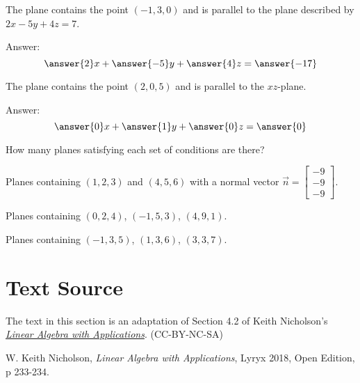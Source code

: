 \documentclass{ximera}
\begin{document}
  \begin{problem}\label{prob:eqplane2}
  The plane contains the point $(-1, 3, 0)$ and is parallel to the plane described by $2x-5y+4z=7$.
   
  Answer:
  $$\answer{2}x+\answer{-5}y+\answer{4}z=\answer{-17}$$
  \end{problem}
   
  \begin{problem}\label{prob:eqplane3}
  The plane contains the point $(2, 0, 5)$ and is parallel to the $xz$-plane.
   
  Answer:
  $$\answer{0}x+\answer{1}y+\answer{0}z=\answer{0}$$
  \end{problem}
 
 
 
 
How many planes satisfying each set of conditions are there?
 
\begin{problem}\label{prob:eqplane4}
Planes containing $(1, 2, 3)$ and $(4, 5, 6)$ with a normal vector $\vec{n}=\begin{bmatrix}-9\\-9\\-9\end{bmatrix}$.
\begin{multipleChoice}
 \end{multipleChoice}
\end{problem}
 
\begin{problem}\label{prob:eqplane5}
Planes containing $(0,2, 4)$, $(-1, 5, 3)$, $(4, 9, 1)$.
\begin{multipleChoice}
 \end{multipleChoice}
\end{problem}
 
\begin{problem}\label{prob:eqplane6}
Planes containing $(-1, 3, 5)$, $(1, 3, 6)$, $(3, 3, 7)$.
\begin{multipleChoice}
 \end{multipleChoice}
\end{problem}
 
 
 
\section*{Text Source}
The text in this section is an adaptation of Section 4.2 of Keith Nicholson's \href{https://open.umn.edu/opentextbooks/textbooks/linear-algebra-with-applications}{\it Linear Algebra with Applications}. (CC-BY-NC-SA)
 
W. Keith Nicholson, {\it Linear Algebra with Applications}, Lyryx 2018, Open Edition, p 233-234.
 
\end{document}
